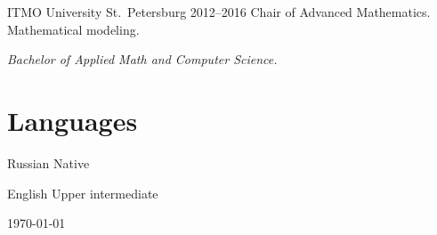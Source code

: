 \documentclass{cv}
\begin{document}
\begin{cvblock}{%
		\blocktitle
		{ITMO University}
		{St.~Petersburg}
		{}
		{2012--2016}}
	Chair of Advanced Mathematics. Mathematical modeling.
	\vspace{1em}

	\textit{Bachelor of Applied Math and Computer Science.}
\end{cvblock}

\section{Languages}

\begin{cvblock}{Russian}
	Native
\end{cvblock}

\begin{cvblock}{English}
	Upper intermediate
\end{cvblock}

\vfill
\begin{center}
	\monthyear\today
\end{center}
\end{document}
